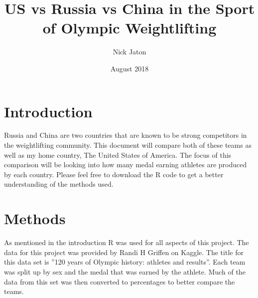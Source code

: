 \documentclass{article}
\title{US vs Russia vs China in the Sport of Olympic Weightlifting}
\author{Nick Jaton}
\date{August 2018}
\begin{document}
\begin{titlepage}
\maketitle
\end{titlepage}

\section{Introduction}
	Russia and China are two countries that are known to be strong competitors in the weightlifting community. This document will compare both of these teams as well as my home country, The United States of America. The focus of this comparison will be looking into how many medal earning athletes are produced by each country. Please feel free to download the R code to get a better understanding of the methods used.

\section{Methods}
	As mentioned in the introduction R was used for all aspects of this project. The data for this project was provided by Randi H Griffen on Kaggle. The title for this data set is ”120 years of Olympic history: athletes and results”. Each team was split up by sex and the medal that was earned by the athlete. Much of the data from this set was then converted to percentages to better compare the teams.
\end{document}
